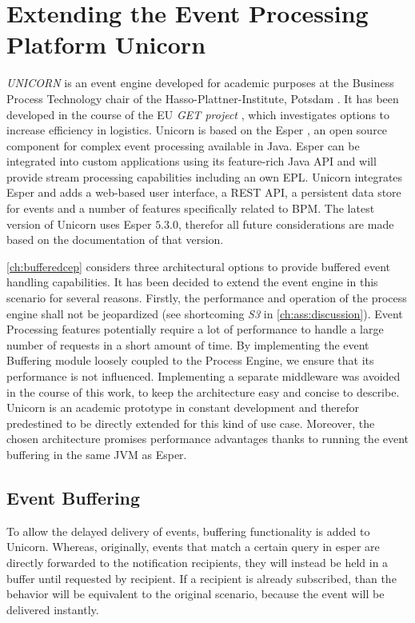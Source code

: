 \section{Extending the Event Processing Platform Unicorn}\label{ch:implunicorn}
\textit{UNICORN} is an event engine developed for academic purposes at the Business Process Technology chair of the Hasso-Plattner-Institute, Potsdam \cite{unicornhome, baumgrass2015get}.
It has been developed in the course of the EU \textit{GET project} \cite{getservicehome}, which investigates options to increase efficiency in logistics.
Unicorn is based on the Esper \cite{esperhome}, an open source component for complex event processing available in Java.
Esper can be integrated into custom applications using its feature-rich Java API and will provide stream processing capabilities including an own \acf{EPL}.
Unicorn integrates Esper and adds a web-based user interface, a REST API, a persistent data store for events and a number of features specifically related to BPM.
The latest version of Unicorn uses Esper $5.3.0$, therefor all future considerations are made based on the documentation of that version.

\autoref{ch:bufferedcep} considers three architectural options to provide buffered event handling capabilities.
It has been decided to extend the event engine in this scenario for several reasons.
Firstly, the performance and operation of the process engine shall not be jeopardized (see shortcoming \textit{S3} in \autoref{ch:ass:discussion}). Event Processing features potentially require a lot of performance to handle a large number of requests in a short amount of time.
By implementing the event Buffering module loosely coupled to the Process Engine, we ensure that its performance is not influenced.
Implementing a separate middleware was avoided in the course of this work, to keep the architecture easy and concise to describe.
Unicorn is an academic prototype in constant development and therefor predestined to be directly extended for this kind of use case.
Moreover, the chosen architecture promises performance advantages thanks to running the event buffering in the same \acs{JVM} as Esper.


\subsection{Event Buffering}
To allow the delayed delivery of events, buffering functionality is added to Unicorn.
Whereas, originally, events that match a certain query in esper are directly forwarded to the notification recipients, they will instead be held in a buffer until requested by recipient. 
If a recipient is already subscribed, than the behavior will be equivalent to the original scenario, because the event will be delivered instantly.

